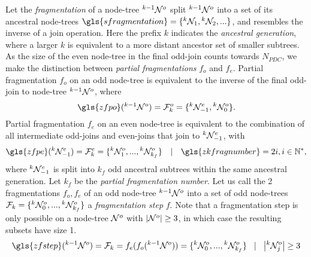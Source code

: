 \begin{definition}\label{def:fragmentation}
  Let the \emph{fragmentation} of a node-tree ${}^{k-1}\mathcal{N}^o$ split ${}^{k-1}\mathcal{N}^o$ into a set of its ancestral node-trees $\gls{sfragmentation} = \{\pre{k}\nset_1, \pre{k}\nset_2, ...\}$, and resembles the inverse of a join operation. Here the prefix $k$ indicates the \emph{ancestral generation}, where a larger $k$ is equivalent to a more distant ancestor set of smaller subtrees. As the size of the even node-tree in the final odd-join counts towards $N_{PDC}$, we make the distinction between \emph{partial fragmentations} $f_o$ and $f_e$. Partial fragmentation $f_o$ on an odd node-tree is equivalent to the inverse of the final odd-join to node-tree ${}^{k-1}\mathcal{N}^o$, where
  \begin{equation}\label{eq:pfe}
    \gls{zfpo}(\pre{k-1}\nset^o) = \m{F}^o_k = \{\pre{k}\nset^e_{-1}, \pre{k}\nset^o_0 \}.
  \end{equation}
  Partial fragmentation $f_e$ on an even node-tree is equivalent to the combination of all intermediate odd-joins and even-joins that join to ${}^{k}\mathcal{N}^e_{-1}$, with
  \begin{equation}\label{eq:pfo}
    \gls{zfpe}(\pre{k}\nset^e_{-1}) = \m{F}^e_k=\{\pre{k}\nset^{o}_1,...,\pre{k}\nset^o_{k_f}\} \hspace{1em} | \hspace{1em} \gls{zkfragnumber} = 2i, i \in \mathbb{N}^*,
  \end{equation}
  where ${}^{k}\mathcal{N}^e_{-1}$ is split into $k_f$ odd ancestral subtrees within the same ancestral generation. Let $k_f$ be the \emph{partial fragmentation number}. Let us call the 2 fragmentations $f_o, f_e$ of an odd node-tree ${}^{k-1}\mathcal{N}^o$ into a set of odd node-trees $\mathcal{F}_k = \{{}^{k}\mathcal{N}^o_0,..., {}^{k}\mathcal{N}^{o}_{k_f}\}$ a \emph{fragmentation step} $f$. Note that a fragmentation step is only possible on a node-tree $\mathcal{N}^o$ with $|{\mathcal{N}^o}| \geq 3$, in which case the resulting subsets have size 1.
  \begin{equation}\label{eq:fstep}
    \gls{zfstep}(\pre{k-1}\nset^o) = \m{F}_k = f_e(f_o(\pre{k-1}\nset^o)) = \{\pre{k}\nset^o_0,...,\pre{k}\nset^{o}_{k_f}\} \hspace{.3cm} | \hspace{.3cm} \abs{{\pre{k}\nset^o_j}} \geq 3
  \end{equation}
\end{definition}



